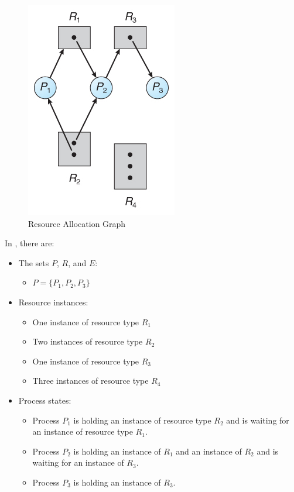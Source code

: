\begin{figure}[h!tbp]
  \centering
  \includegraphics{./Drawings/EDAF35-Operating_Systems/Resource_Allocation_Graph.jpg}
  \caption{Resource Allocation Graph}
  \label{fig:Resource_Allocation_Graph}
\end{figure}

In , there are:
\begin{itemize}[noitemsep]
\item The sets $P$, $R$, and $E$:
  \begin{itemize}[noitemsep]
  \item $P = \lbrace P_{1}, P_{2}, P_{3} \rbrace$
  \end{itemize}

\item Resource instances:
  \begin{itemize}[noitemsep]
  \item One instance of resource type $R_{1}$
  \item Two instances of resource type $R_{2}$
  \item One instance of resource type $R_{3}$
  \item Three instances of resource type $R_{4}$
  \end{itemize}

\item Process states:
  \begin{itemize}[noitemsep]
  \item Process $P_{1}$ is holding an instance of resource type $R_{2}$ and is waiting for an instance of resource type $R_{1}$.
  \item Process $P_{2}$ is holding an instance of $R_{1}$ and an instance of $R_{2}$ and is waiting for an instance of $R_{3}$.
  \item Process $P_{3}$ is holding an instance of $R_{3}$.
  \end{itemize}
\end{itemize}

